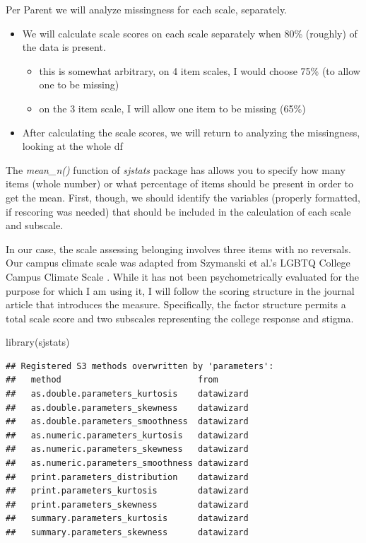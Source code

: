 \documentclass[
]{book}
\newenvironment{Shaded}{\begin{snugshade}}{\end{snugshade}}
\newcommand{\FunctionTok}[1]{\textcolor[rgb]{0.00,0.00,0.00}{#1}}
\newcommand{\NormalTok}[1]{#1}
\providecommand{\tightlist}{%
  \setlength{\itemsep}{0pt}\setlength{\parskip}{0pt}}
\begin{document}
Per Parent \citeyearpar{parent_handling_2013} we will analyze missingness for each scale, separately.

\begin{itemize}
\tightlist
\item
  We will calculate scale scores on each scale separately when 80\% (roughly) of the data is present.

  \begin{itemize}
  \tightlist
  \item
    this is somewhat arbitrary, on 4 item scales, I would choose 75\% (to allow one to be missing)
  \item
    on the 3 item scale, I will allow one item to be missing (65\%)
  \end{itemize}
\item
  After calculating the scale scores, we will return to analyzing the missingness, looking at the whole df
\end{itemize}

The \emph{mean\_n()} function of \emph{sjstats} package has allows you to specify how many items (whole number) or what percentage of items should be present in order to get the mean. First, though, we should identify the variables (properly formatted, if rescoring was needed) that should be included in the calculation of each scale and subscale.

In our case, the scale assessing belonging \citep{bollen_perceived_1990, hurtado_effects_1997} involves three items with no reversals. Our campus climate scale was adapted from Szymanski et al.'s LGBTQ College Campus Climate Scale \citep{szymanski_perceptions_2020}. While it has not been psychometrically evaluated for the purpose for which I am using it, I will follow the scoring structure in the journal article that introduces the measure. Specifically, the factor structure permits a total scale score and two subscales representing the college response and stigma.

\begin{Shaded}
\begin{Highlighting}[]
\FunctionTok{library}\NormalTok{(sjstats)}
\end{Highlighting}
\end{Shaded}

\begin{verbatim}
## Registered S3 methods overwritten by 'parameters':
##   method                           from      
##   as.double.parameters_kurtosis    datawizard
##   as.double.parameters_skewness    datawizard
##   as.double.parameters_smoothness  datawizard
##   as.numeric.parameters_kurtosis   datawizard
##   as.numeric.parameters_skewness   datawizard
##   as.numeric.parameters_smoothness datawizard
##   print.parameters_distribution    datawizard
##   print.parameters_kurtosis        datawizard
##   print.parameters_skewness        datawizard
##   summary.parameters_kurtosis      datawizard
##   summary.parameters_skewness      datawizard
\end{verbatim}
\end{document}

